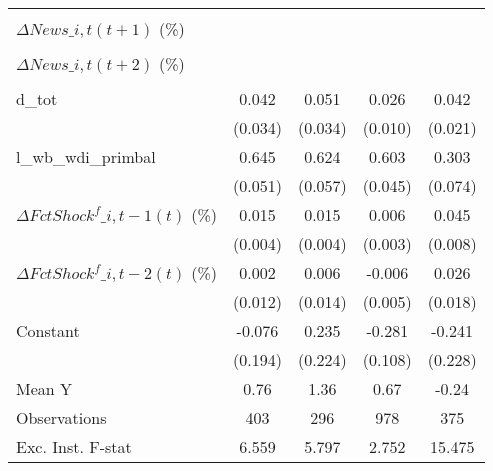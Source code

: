 {\begin{tabular}{l*{4}{c}}
                    &                     &                     &                     &                     \\
\addlinespace
$ \Delta News\_{i,t}(t+1)$ (\%)&                     &                     &                     &                     \\
                    &                     &                     &                     &                     \\
\addlinespace
$ \Delta News\_{i,t}(t+2)$ (\%)&                     &                     &                     &                     \\
                    &                     &                     &                     &                     \\
\addlinespace
d\_tot               &       0.042         &       0.051         &       0.026\sym{**} &       0.042\sym{*}  \\
                    &     (0.034)         &     (0.034)         &     (0.010)         &     (0.021)         \\
\addlinespace
l\_wb\_wdi\_primbal    &       0.645\sym{***}&       0.624\sym{***}&       0.603\sym{***}&       0.303\sym{***}\\
                    &     (0.051)         &     (0.057)         &     (0.045)         &     (0.074)         \\
\addlinespace
$ \Delta FctShock^f\_{i,t-1}(t)$ (\%)&       0.015\sym{***}&       0.015\sym{***}&       0.006\sym{*}  &       0.045\sym{***}\\
                    &     (0.004)         &     (0.004)         &     (0.003)         &     (0.008)         \\
\addlinespace
$ \Delta FctShock^f\_{i,t-2}(t)$ (\%)&       0.002         &       0.006         &      -0.006         &       0.026         \\
                    &     (0.012)         &     (0.014)         &     (0.005)         &     (0.018)         \\
\addlinespace
Constant            &      -0.076         &       0.235         &      -0.281\sym{**} &      -0.241         \\
                    &     (0.194)         &     (0.224)         &     (0.108)         &     (0.228)         \\
\midrule
Mean Y              &        0.76         &        1.36         &        0.67         &       -0.24         \\
Observations        &         403         &         296         &         978         &         375         \\
Exc. Inst. F-stat   &       6.559         &       5.797         &       2.752         &      15.475         \\
\bottomrule
\end{tabular}
}
